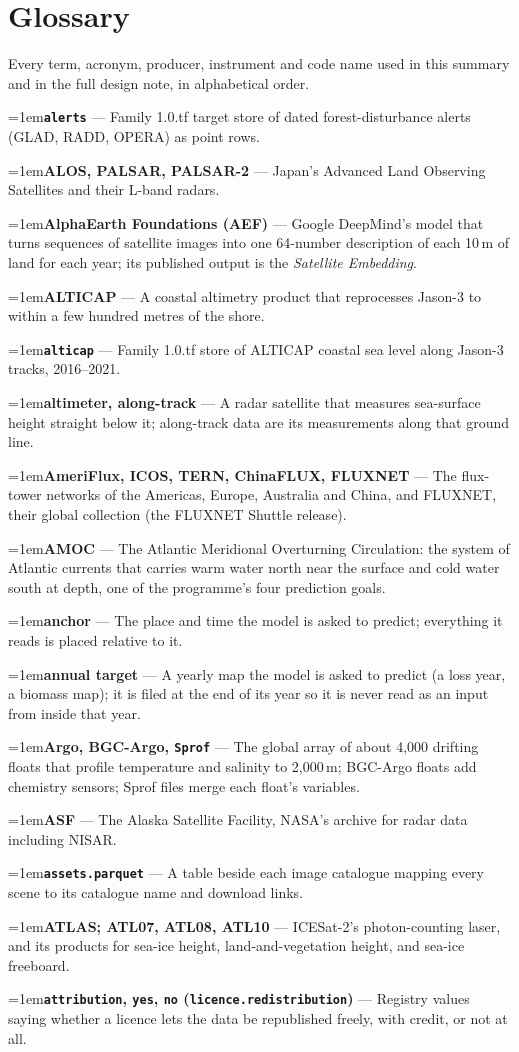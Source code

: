 \documentclass[10pt]{article}
\newcommand{\code}[1]{\texttt{#1}}
\newcommand{\gl}[2]{\par\hangindent=1em\hangafter=1\textbf{#1} --- #2\par}
\begin{document}
\clearpage
{}\label{glossary}
\section*{Glossary}
Every term, acronym, producer, instrument and code name used in this summary and in the full design note, in alphabetical order.
\small
\gl{\code{alerts}}{Family 1.0.tf target store of dated forest-disturbance alerts (GLAD, RADD, OPERA) as point rows.}
\gl{ALOS, PALSAR, PALSAR-2}{Japan's Advanced Land Observing Satellites and their L-band radars.}
\gl{AlphaEarth Foundations (AEF)}{Google DeepMind's model that turns sequences of satellite images into one 64-number description of each 10\,m of land for each year; its published output is the \emph{Satellite Embedding}.}
\gl{ALTICAP}{A coastal altimetry product that reprocesses Jason-3 to within a few hundred metres of the shore.}
\gl{\code{alticap}}{Family 1.0.tf store of ALTICAP coastal sea level along Jason-3 tracks, 2016--2021.}
\gl{altimeter, along-track}{A radar satellite that measures sea-surface height straight below it; along-track data are its measurements along that ground line.}
\gl{AmeriFlux, ICOS, TERN, ChinaFLUX, FLUXNET}{The flux-tower networks of the Americas, Europe, Australia and China, and FLUXNET, their global collection (the FLUXNET Shuttle release).}
\gl{AMOC}{The Atlantic Meridional Overturning Circulation: the system of Atlantic currents that carries warm water north near the surface and cold water south at depth, one of the programme's four prediction goals.}
\gl{anchor}{The place and time the model is asked to predict; everything it reads is placed relative to it.}
\gl{annual target}{A yearly map the model is asked to predict (a loss year, a biomass map); it is filed at the end of its year so it is never read as an input from inside that year.}
\gl{Argo, BGC-Argo, \code{Sprof}}{The global array of about 4,000 drifting floats that profile temperature and salinity to 2,000\,m; BGC-Argo floats add chemistry sensors; Sprof files merge each float's variables.}
\gl{ASF}{The Alaska Satellite Facility, NASA's archive for radar data including NISAR.}
\gl{\code{assets.parquet}}{A table beside each image catalogue mapping every scene to its catalogue name and download links.}
\gl{ATLAS; ATL07, ATL08, ATL10}{ICESat-2's photon-counting laser, and its products for sea-ice height, land-and-vegetation height, and sea-ice freeboard.}
\gl{\code{attribution}, \code{yes}, \code{no} (\code{licence.redistribution})}{Registry values saying whether a licence lets the data be republished freely, with credit, or not at all.}
\end{document}
